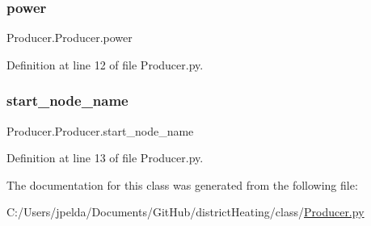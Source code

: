 \subsubsection{\texorpdfstring{power}{power}}
{\footnotesize\ttfamily Producer.\+Producer.\+power}



Definition at line 12 of file Producer.\+py.

\mbox{\label{class_producer_1_1_producer_ac2dfdc8e4a892cf9ada2722051190045}} 
\subsubsection{\texorpdfstring{start\+\_\+node\+\_\+name}{start\_node\_name}}
{\footnotesize\ttfamily Producer.\+Producer.\+start\+\_\+node\+\_\+name}



Definition at line 13 of file Producer.\+py.



The documentation for this class was generated from the following file\+:\begin{DoxyCompactItemize}
\item 
C\+:/\+Users/jpelda/\+Documents/\+Git\+Hub/district\+Heating/class/\hyperlink{_producer_8py}{Producer.\+py}\end{DoxyCompactItemize}
